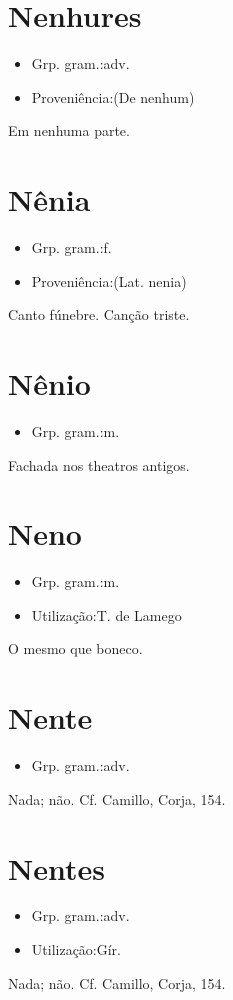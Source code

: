 \section{Nenhures}
\begin{itemize}
\item {Grp. gram.:adv.}
\end{itemize}
\begin{itemize}
\item {Proveniência:(De \textunderscore nenhum\textunderscore )}
\end{itemize}
Em nenhuma parte.
\section{Nênia}
\begin{itemize}
\item {Grp. gram.:f.}
\end{itemize}
\begin{itemize}
\item {Proveniência:(Lat. \textunderscore nenia\textunderscore )}
\end{itemize}
Canto fúnebre.
Canção triste.
\section{Nênio}
\begin{itemize}
\item {Grp. gram.:m.}
\end{itemize}
Fachada nos theatros antigos.
\section{Neno}
\begin{itemize}
\item {Grp. gram.:m.}
\end{itemize}
\begin{itemize}
\item {Utilização:T. de Lamego}
\end{itemize}
O mesmo que \textunderscore boneco\textunderscore .
\section{Nente}
\begin{itemize}
\item {Grp. gram.:adv.}
\end{itemize}
Nada; não. Cf. Camillo, \textunderscore Corja\textunderscore , 154.
\section{Nentes}
\begin{itemize}
\item {Grp. gram.:adv.}
\end{itemize}
\begin{itemize}
\item {Utilização:Gír.}
\end{itemize}
Nada; não. Cf. Camillo, \textunderscore Corja\textunderscore , 154.
